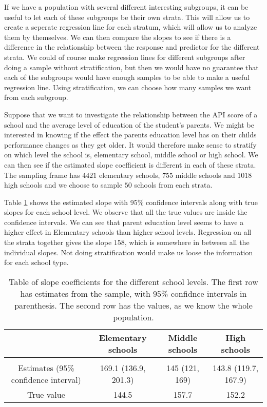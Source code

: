 \documentclass{article}
\begin{document}
If we have a population with several different interesting subgroups, it can be
useful to let each of these subgroups be their own strata. This will allow us to
create a seperate regression line for each stratum, which will allow us to
analyze them by themselves. We can then compare the slopes to see if there is a difference in the relationship between the
response and predictor for the different strata. We could of course make
regression lines for different subgroups after doing a sample without stratification,
but then we would have no guarantee that each of the subgroups would have enough
samples to be able to make a useful regression line. Using stratification, we can
choose how many samples we want from each subgroup.

\begin{example}
  Suppose that we want to investigate the relationship between the API score of
  a school and the average level of education of the student's parents. We might
  be interested in knowing if the effect the parents education level has on
  their childs performance changes as they get older. It would therefore make
  sense to stratify on which level the school is, elementary school, middle
  school or high school. We can then see if the estimated slope coefficient is
  different in each of these strata.
  The sampling frame has \(4421\) elementary schools, \(755\) middle schools and
  \(1018\) high schools and we choose to sample \(50\) schools from each strata.

  Table \ref{tab:exStrat} shows the estimated slope with 95\% confidence intervals along with
  true slopes for each school level. We observe that all the true values are
  inside the confidence intervals. We can see that
  parent education level seems to have a higher effect in Elementary schools
  than higher school levels. Regression on all the strata together gives the
  slope \(158\), which is somewhere in between all the individual slopes. Not
  doing stratification would make us loose the information for each
  school type.

  \begin{table}
    \centering
  \begin{tabular}{c|ccc}
    & Elementary schools & Middle schools & High schools \\
    \hline \\
    Estimates (95\% confidence interval) & 169.1 (136.9, 201.3) & 145 (121, 169) & 143.8 (119.7, 167.9) \\
    True value & 144.5 & 157.7 & 152.2
  \end{tabular}
  \label{tab:exStrat}
  \caption{Table of slope coefficients for the different school levels. The
    first row has estimates from the sample, with 95\% confidnce intervals in
    parenthesis. The second row has the values, as we know the whole population.}
  \end{table}
\end{example}
\end{document}
